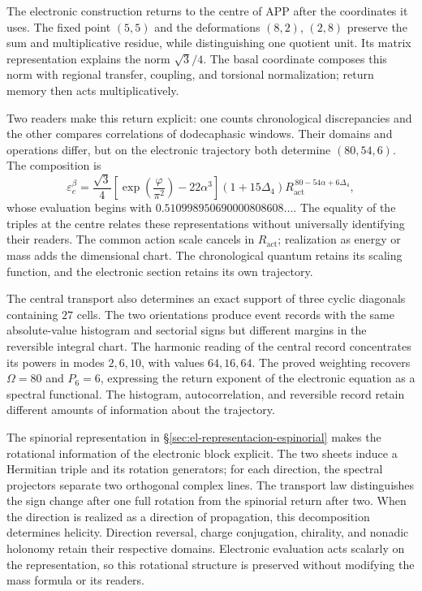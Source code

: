 The electronic construction returns to the centre of APP after the coordinates it uses. The fixed point \((5,5)\) and the deformations \((8,2)\), \((2,8)\) preserve the sum and multiplicative residue, while distinguishing one quotient unit. Its matrix representation explains the norm \(\sqrt3/4\). The basal coordinate composes this norm with regional transfer, coupling, and torsional normalization; return memory then acts multiplicatively.

Two readers make this return explicit: one counts chronological discrepancies and the other compares correlations of dodecaphasic windows. Their domains and operations differ, but on the electronic trajectory both determine \((80,54,6)\). The composition is
\[
 \varepsilon_e^\beta
 =\frac{\sqrt3}{4}
 \left[\exp\!\left(\frac{\varphi}{\pi^2}\right)-22\alpha^3\right]
 (1+15\Delta_4)
 R_{\mathrm{act}}^{\,80-54\alpha+6\Delta_4},
\]
whose evaluation begins with \(0.510998950690000808608\ldots\). The equality of the triples at the centre relates these representations without universally identifying their readers. The common action scale cancels in \(R_{\mathrm{act}}\); realization as energy or mass adds the dimensional chart. The chronological quantum retains its scaling function, and the electronic section retains its own trajectory.

The central transport also determines an exact support of three cyclic
diagonals containing \(27\) cells. The two orientations produce event
records with the same absolute-value histogram and sectorial signs but different margins in
the reversible integral chart. The harmonic reading of the central record
concentrates its powers in modes \(2,6,10\), with values \(64,16,64\).
The proved weighting recovers \(\Omega=80\) and \(P_6=6\), expressing
the return exponent of the electronic equation as a spectral functional.
The histogram, autocorrelation, and reversible record retain different
amounts of information about the trajectory.

The spinorial representation in \S\ref{sec:el-representacion-espinorial}
makes the rotational information of the electronic block explicit. The two sheets
induce a Hermitian triple and its rotation generators; for each direction,
the spectral projectors separate two orthogonal complex lines. The transport
law distinguishes the sign change after one full rotation from the
spinorial return after two. When the direction is realized as a direction
of propagation, this decomposition determines helicity. Direction
reversal, charge conjugation, chirality, and nonadic holonomy
retain their respective domains. Electronic evaluation acts
scalarly on the representation, so this rotational structure
is preserved without modifying the mass formula or its readers.

